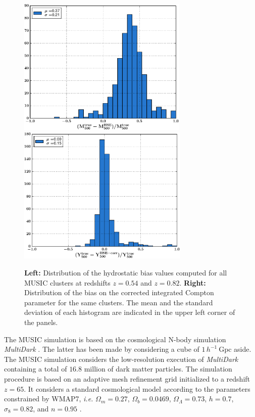 \documentclass[twocolumn,traditabstract]{aa}
\begin{document}
\begin{figure}[h!]
\centering
\includegraphics[height=6.6cm]{Histo_mass_MUSIC.pdf}
\hspace{1cm}
\includegraphics[height=6.6cm]{Histo_Y_MUSIC.pdf}
\caption{{\footnotesize \textbf{Left:} Distribution of the hydrostatic bias values computed for all MUSIC clusters at redshifts $z = 0.54$ and $z = 0.82$. \textbf{Right:} Distribution of the bias on the corrected integrated Compton parameter for the same clusters. The mean and the standard deviation of each histogram are indicated in the upper left corner of the panels.}}
\label{fig:mass_Y500_bias}
\end{figure}

The MUSIC simulation is based on the cosmological N-body simulation \emph{MultiDark} \citep{pra12}. The latter has been made by considering a cube of $1 \, h^{-1}~\mathrm{Gpc}$ aside. The MUSIC simulation considers the low-resolution execution of \emph{MultiDark} containing a total of $16.8$ million of dark matter particles. The simulation procedure is based on an adaptive mesh refinement grid initialized to a redshift $z=65$. It considers a standard cosmological model according to the parameters constrained by WMAP7, \emph{i.e.} $\Omega_m = 0.27$, $\Omega_b = 0.0469$, $\Omega_{\Lambda} = 0.73$, $h=0.7$, $\sigma_8 = 0.82$, and $n = 0.95$ \citep{kom11}.\\
\end{document}
